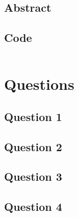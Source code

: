 \documentclass[11pt]{article}
\begin{document}
\subsection*{Abstract}

\subsection*{Code}

\begin{lstlisting}
\end{lstlisting}

\section*{Questions}
\subsection*{Question 1}

\subsection*{Question 2}

\subsection*{Question 3}

\subsection*{Question 4}
\end{document}
